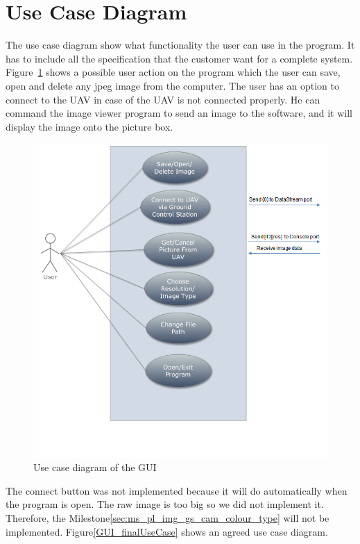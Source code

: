 \section{Use Case Diagram}
The use case diagram show what functionality the user can use in the program.
It has to include all the specification that the customer want for a complete system.
Figure~\ref{GUI_useCase} shows a possible user action on the program which the user can save, open and delete any jpeg image from the computer. 
The user has an option to connect to the UAV in case of the UAV is not connected properly.
He can command the image viewer program to send an image to the software, and it will display the image onto the picture box.
\begin{figure}[H]
\begin{center}
\includegraphics[scale=0.6]{figures/userCase.png} 
\end{center}
\caption{Use case diagram of the GUI\label{GUI_useCase}}
\end{figure}

The connect button was not implemented because it will do automatically when the program is open.
The raw image is too big so we did not implement it.
Therefore, the Milestone\ref{sec:ms_pl_img_gs_cam_colour_type} will not be implemented.
Figure\ref{GUI_finalUseCase} shows an agreed use case diagram. 

